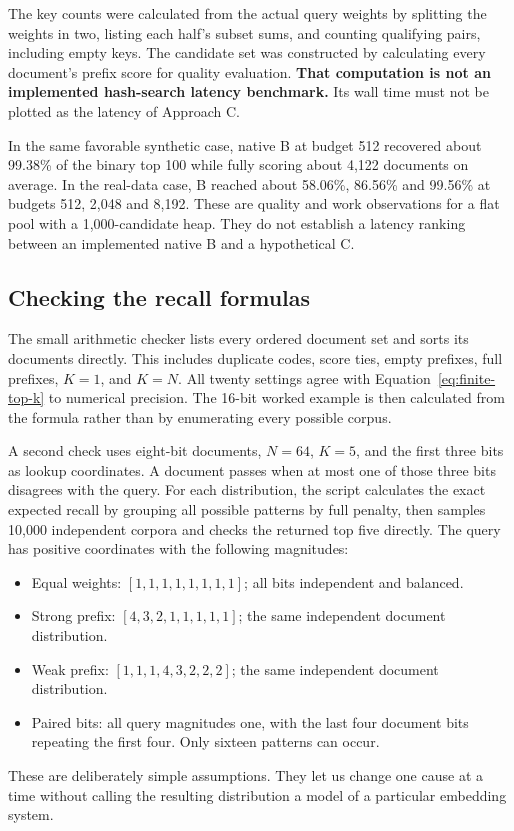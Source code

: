 The key counts were calculated from the actual query weights by splitting the weights in two, listing each half's subset sums, and counting qualifying pairs,
including empty keys. The candidate set was constructed by calculating every document's prefix score for quality evaluation. \textbf{That computation is not an implemented hash-search
latency benchmark.} Its wall time must not be plotted as the latency of Approach C.

In the same favorable synthetic case, native B at budget 512 recovered about 99.38\% of the
binary top 100 while fully scoring about 4,122 documents on average. In the real-data case,
B reached about 58.06\%, 86.56\% and 99.56\% at budgets 512, 2,048 and 8,192. These are quality
and work observations for a flat pool with a 1,000-candidate heap. They do not establish a
latency ranking between an implemented native B and a hypothetical C.

\subsection{Checking the recall formulas}
\label{sec:recall-checks}
The small arithmetic checker lists every ordered document set and sorts its documents directly.
This includes duplicate codes, score ties, empty prefixes, full prefixes, $K=1$, and $K=N$.
All twenty settings agree with Equation~\eqref{eq:finite-top-k} to numerical precision. The
16-bit worked example is then calculated from the formula rather than by enumerating every
possible corpus.

A second check uses eight-bit documents, $N=64$, $K=5$, and the first three bits as lookup
coordinates. A document passes when at most one of those three bits disagrees with the query.
For each distribution, the script calculates the exact expected recall by grouping all possible
patterns by full penalty, then samples 10,000 independent corpora and checks the returned top
five directly. The query has positive coordinates with the following magnitudes:
\begin{itemize}
\item Equal weights: $[1,1,1,1,1,1,1,1]$; all bits independent and balanced.
\item Strong prefix: $[4,3,2,1,1,1,1,1]$; the same independent document distribution.
\item Weak prefix: $[1,1,1,4,3,2,2,2]$; the same independent document distribution.
\item Paired bits: all query magnitudes one, with the last four document bits repeating the
first four. Only sixteen patterns can occur.
\end{itemize}
These are deliberately simple assumptions. They let us change one cause at a time without
calling the resulting distribution a model of a particular embedding system.

